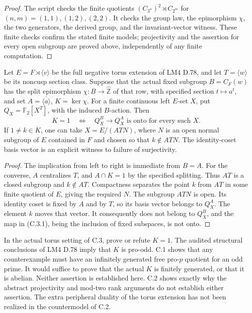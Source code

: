 \begin{proof}
The script  checks the finite
quotients $(C_{3^n})^2\rtimes C_{2^m}$ for $(n,m)=(1,1),(1,2),(2,2)$.
It checks the group law, the epimorphism $\chi$, the two generators,
the derived group, and the invariant-vector witness.  These finite
checks confirm the stated finite models; projectivity and the
assertion for every open subgroup are proved above, independently
of any finite computation.
\end{proof}

Let $E=F\rtimes\langle v\rangle$ be the full negative torus
extension of LM4 D.78, and let $T=\langle w\rangle$ be its
noncusp section class.  Suppose that the actual fixed subgroup
$B=C_F(w)$ has the split epimorphism
$\chi:B\to\widehat{\mathbb Z}$ of that row, with specified
section $t\mapsto a^t$, and set $A=\overline{\langle a\rangle}$,
$K=\ker\chi$.  For a finite continuous left $E$-set $X$, put
$Q_X=\mathbb F_2[X^T]$, with the induced $B$-action.  Then
\[
 K=1\quad\Longleftrightarrow\quad
 Q_X^B\longrightarrow Q_X^A\text{ is onto for every such }X.
                                                                  \tag{C.3.1}
\]
If $1\ne k\in K$, one can take $X=E/(ATN)$, where $N$ is
an open normal subgroup of $E$ contained in $F$ and chosen so
that $k\notin ATN$.  The identity-coset basis vector is an explicit
witness to failure of surjectivity.

\begin{proof}
The implication from left to right is immediate from $B=A$.
For the converse, $A$ centralizes $T$, and $A\cap K=1$ by
the specified splitting.  Thus $AT$ is a closed subgroup and
$k\notin AT$.  Compactness separates the point $k$ from $AT$
in some finite quotient of $E$, giving the required $N$.
The subgroup $ATN$ is open.  Its identity coset is fixed by
$A$ and by $T$, so its basis vector belongs to $Q_X^A$.
The element $k$ moves that vector.  It consequently does not
belong to $Q_X^B$, and the map in (C.3.1), being the inclusion
of fixed subspaces, is not onto.
\end{proof}

In the actual torus setting of C.3, prove or refute $K=1$.
The audited structural conclusions of LM4 D.78 imply that $K$ is
pro-odd.  C.1 shows that any counterexample must have an infinitely
generated free pro-$p$ quotient for an odd prime.  It would suffice
to prove that the actual $K$ is finitely generated, or that it is
abelian.  Neither assertion is established here.  C.2 shows exactly
why the abstract projectivity and mod-two rank arguments do not
establish either assertion.  The extra peripheral duality of the
torus extension has not been realized in the countermodel of C.2.

